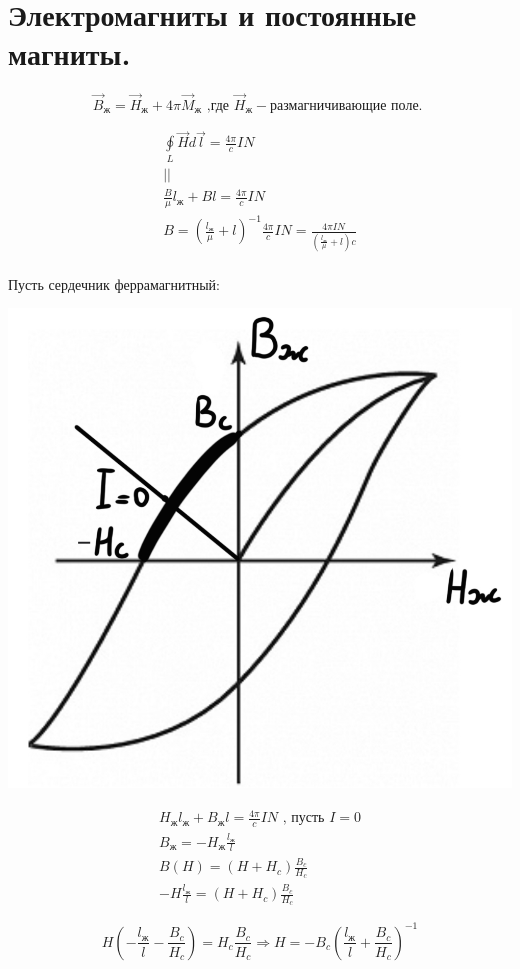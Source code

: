 \section{Электромагниты и постоянные магниты.}


\[
\vec{B}_{\text{ж}}=\vec{H}_{\text{ж}}+4\pi\vec{M}_{\text{ж}} \text{ ,где  }
\vec{H}_{\text{ж}}-\text{размагничивающие поле. }
\]

\begin{gather*}
    \underset{L}{\oint}\vec{H}d\vec{l}=\frac{4\pi}{c}IN \\
    || \\
    \frac{B}{\mu}l_{\text{ж}}+Bl=\frac{4\pi}{c}IN \\
    B=\left( \frac{l_{\text{ж}}}{\mu}+l  \right)^{-1} \frac{4\pi}{c}IN= \frac{4\pi IN}{\left( \frac{l_{\text{ж}}}{\mu} +l \right)c} \\
\end{gather*}

Пусть сердечник феррамагнитный:

\begin{minipage}[c]{0.4\textwidth} %
    \includegraphics[width=\textwidth]{im/83.png} %
\end{minipage}%
\hfill
\begin{minipage}[c]{0.6\textwidth} %
    \begin{gather*}
        H_{\text{ж}}l_{\text{ж}}+B_{\text{ж}}l=\frac{4\pi}{c}IN \text{ , пусть } I=0 \\
        B_{\text{ж}}=-H_{\text{ж}}\frac{l_{\text{ж}}}{l} \\
        B(H)=(H+H_c)\frac{B_c}{H_c} \\
        -H\frac{l_{\text{ж}}}{l}=(H+H_c)\frac{B_c}{H_c}     
    \end{gather*}
\end{minipage}
\[
H\left( -\frac{l_{\text{ж}}}{l}-\frac{B_c}{H_c}  \right)=H_c \frac{B_c}{H_c}\Rightarrow \boxed{H=-B_c\left( \frac{l_{\text{ж}}}{l}+\frac{B_c}{H_c}  \right)^{-1} } 
\]

